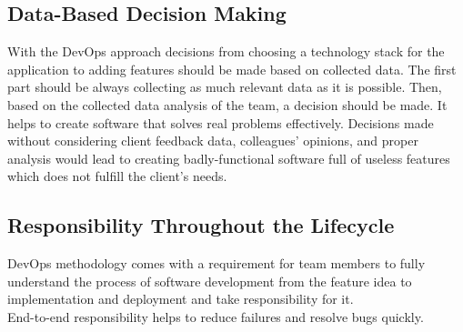 \subsection{Data-Based Decision Making} With the DevOps approach decisions from choosing a technology stack for the application to adding features should be made based on collected data. The first part should be always collecting as much relevant data as it is possible. Then, based on the collected data analysis of the team, a decision should be made. It helps to create software that solves real problems effectively. Decisions made without considering client feedback data, colleagues' opinions, and proper analysis would lead to creating badly-functional software full of useless features which does not fulfill the client's needs.

\subsection{Responsibility Throughout the Lifecycle} DevOps methodology comes with a requirement for team members to fully understand the process of software development from the feature idea to implementation and deployment and take responsibility for it.\\
End-to-end responsibility helps to reduce failures and resolve bugs quickly.










